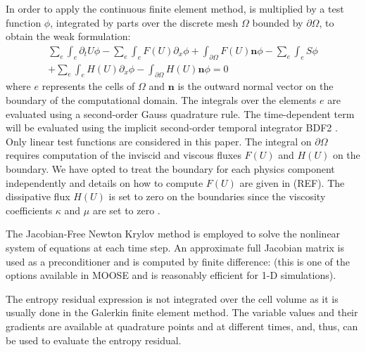 \documentclass[times,doublespace]{fldauth}%
\begin{document}
In order to apply the continuous finite element method,  is multiplied by a test function $\phi$, integrated by parts over the discrete mesh $\Omega$ bounded by $\partial \Omega$, to obtain the weak formulation:
\begin{multline}
\sum_e \int_{e} \partial_t U \phi - \sum_e \int_{e} F(U) \partial_x \phi + \int_{\partial \Omega} F(U) \mathbf{n} \phi - 
 \sum_e \int_{e} S \phi \\
 + \sum_e \int_{e} H(U) \partial_x \phi - \int_{\partial \Omega}H \left( U \right) \mathbf{n} \phi= 0
\end{multline}
where $e$ represents the cells of $\Omega$ and $\mathbf{n}$ is the outward normal vector on the boundary of the computational domain. 
The integrals over the elements $e$ are evaluated using a second-order Gauss quadrature rule. The time-dependent term will be evaluated using the implicit second-order temporal integrator BDF2 \cite{Leveque}. Only linear test functions are considered in this paper.
The integral on $\partial \Omega$ requires computation of the inviscid and viscous fluxes $F(U)$ and $H(U)$ on the boundary. We have opted to treat the boundary for each physics component independently and details on how to compute $F(U)$ are given in (REF). The dissipative flux $H(U)$ is set to zero on the boundaries since the viscosity coefficients $\kappa$ and $\mu$ are set to zero \cite{jlg1, jlg2, valentin}. 

The Jacobian-Free Newton Krylov method \cite{JFNK} is employed to solve the nonlinear system of equations at each time step.
An approximate full Jacobian matrix is used as a preconditioner and is computed by finite difference: (this is one of the options available in MOOSE and is reasonably efficient for 1-D simulations). 

\begin{remark}
The entropy residual expression is not integrated over the cell volume as it is usually done in the Galerkin finite element method. The variable values and their gradients are available at quadrature points and at different times, and, thus, can be used to evaluate the entropy residual. 
\end{remark}
%
\end{document}
